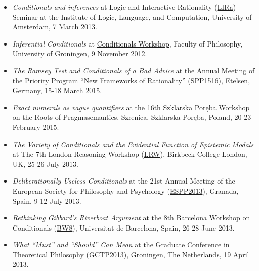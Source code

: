 \documentclass[a4paper,12pt]{article}
\begin{document}
\begin{small}
\begin{itemize}
  \item \emph{Conditionals and inferences} at Logic and Interactive
    Rationality (\href{http://www.illc.uva.nl/lgc/seminar/}{LIRa})
    Seminar at the Institute of Logic, Language, and Computation,
    University of Amsterdam, 7 March 2013.
  
  \item \emph{Inferential Conditionals} at
    \href{https://sites.google.com/site/jannekehuitink/workshop}{Conditionals
      Workshop}, Faculty of Philosophy, University of Groningen, 9
    November 2012.
  \end{itemize}
  
  \begin{itemize}
  \item \emph{The Ramsey Test and Conditionals of a Bad Advice} at the Annual Meeting of the Priority Program ``New Frameworks of Rationality'' (\href{http://www.spp1516.de}{SPP1516}), Etelsen, Germany, 15-18 March 2015.


  \item \emph{Exact numerals as vague quantifiers} at the \href{https://sites.google.com/site/szklarskaporebaworkshop16/}{16th Szklarska Poręba Workshop} on the Roots of Pragmasemantics, Szrenica, Szklarska Poręba, Poland, 20-23 February 2015.

  \item \emph{The Variety of Conditionals and the Evidential Function
      of Epistemic Modals} at The 7th London Reasoning Workshop (\href{http://www.bbk.ac.uk/psychology/about-us/events/the-7th-london-reasoning-workshop}{LRW}), Birkbeck
    College London, UK, 25-26 July 2013.

  \item \emph{Deliberationally Useless Conditionals} at the 21st
    Annual Meeting of the European Society for Philosophy and
    Psychology (\href{http://espp2013.com}{ESPP2013}), Granada, Spain,
    9-12 July 2013.

  \item \emph{Rethinking Gibbard’s Riverboat Argument} at the 8th
    Barcelona Workshop on Conditionals
    (\href{http://www.ub.edu/logosbw/bw8/index.html}{BW8}),
    Universitat de Barcelona, Spain, 26-28 June 2013.
    
  \item \emph{What ``Must'' and ``Should'' Can Mean} at the Graduate
    Conference in Theoretical Philosophy
    (\href{http://www.philos.rug.nl/GCTP2013/}{GCTP2013}), Groningen, The Netherlands, 19 April
    2013. %
    

\end{itemize}
\end{small}
\end{document}
